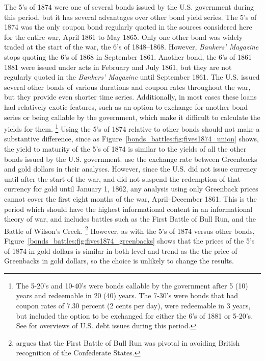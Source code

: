 The 5's of 1874 were one of several bonds issued by the U.S. government during this period, but it has several advantages over other bond yield series.
The 5's of 1874 was the only coupon bond regularly quoted in the sources considered here for the entire war, April 1861 to May 1865.
Only one other bond was widely traded at the start of the war, the 6's of 1848--1868.
However, \textit{Bankers' Magazine} stops quoting the 6's of 1868 in September 1861.
Another bond, the  6's of 1861--1881 were issued under acts in February and July 1861, but they are not regularly quoted in the \textit{Bankers' Magazine} until September 1861.
The U.S. issued several other bonds of various durations and coupon rates throughout the war, but they provide even shorter time series.
Additionally, in most cases these loans had relatively exotic features, such as an option to exchange for another bond series or being callable by the government, which make it difficult to calculate the yields for them.
\footnote{
  The 5-20's and 10-40's were bonds callable by the government after 5 (10) years and redeemable in 20 (40) years.
  The 7-30's were bonds that had coupon rates of 7.30 percent (2 cents per day), were redeemable in 3 years, but included the option to be exchanged for either the 6's of 1881 or 5-20's.
  See \textcites{Bayley1882}{DeKnight1900}[297--309]{HomerSylla2005} for overviews of U.S. debt issues during this period.
}
Using the 5's of 1874 relative to other bonds should not make a substantive difference, since as Figure~\ref{bonds_battles:fig:fives1874_union} shows, the yield to maturity of the 5's of 1874 is similar to the yields of all the other bonds issued by the U.S. government.
\textcites{WillardGuinnaneEtAl1996}{McCandless1996}{SmithSmith1997} use the exchange rate between Greenbacks and gold dollars in their analyses.
However, since the U.S. did not issue currency until after the start of the war, and did not suspend the redemption of that currency for gold until January 1, 1862, any analysis using only Greenback prices cannot cover the first eight months of the war, April--December 1861.
This is the period which should have the highest informational content in an informational theory of war, and includes battles such as the First Battle of Bull Run, and the Battle of Wilson's Creek.%
\footnote{\textcite{Poast2012} argues that the First Battle of Bull Run was pivotal in avoiding British recognition of the Confederate States.}
However, as with the 5's of 1874 versus other bonds,  Figure~\ref{bonds_battles:fig:fives1874_greenbacks} shows that the prices of the 5's of 1874 in gold dollars is similar in both level and trend as the the price of Greenbacks in gold dollars, so the choice is unlikely to change the results.

